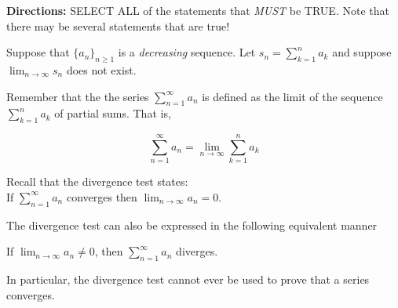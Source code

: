 \documentclass{ximera}
\author{Jim Talamo,Jason Miller}
\begin{document}
\begin{exercise}

\textbf{Directions:} SELECT ALL of the statements that \emph{MUST} be TRUE.  Note that there may be several statements that are true! 

 Suppose that $\displaystyle\{a_n\}_{n \geq 1}$ is a \emph{decreasing} sequence.  Let $s_n =\displaystyle  \sum^n_{k=1} a_k$ and suppose $\displaystyle \lim_{n \rightarrow \infty} s_n$ does  not exist.


\begin{selectAll}
\end{selectAll}

\begin{hint}
Remember that the the series $\sum^{\infty}_{n=1} a_n$ is defined as the limit of the sequence $\sum^{n}_{k=1} a_k$ of partial sums. That is, 

\[
\sum^{\infty}_{n=1} a_n = \lim_{n \to \infty} \sum^n_{k=1} a_k
\]
\end{hint}


\begin{hint}
Recall that the divergence test states: \\
If $\sum^{\infty}_{n=1} a_n $ converges then $\lim_{n \to \infty} a_n=0$. 

The divergence test can also be expressed in the following equivalent manner

If $\lim_{n \to \infty} a_n \neq 0$, then $\sum^{\infty}_{n=1} a_n$ diverges. 

In particular, the divergence test cannot ever be used to prove that a series converges.
\end{hint}





\end{exercise}
\end{document}
